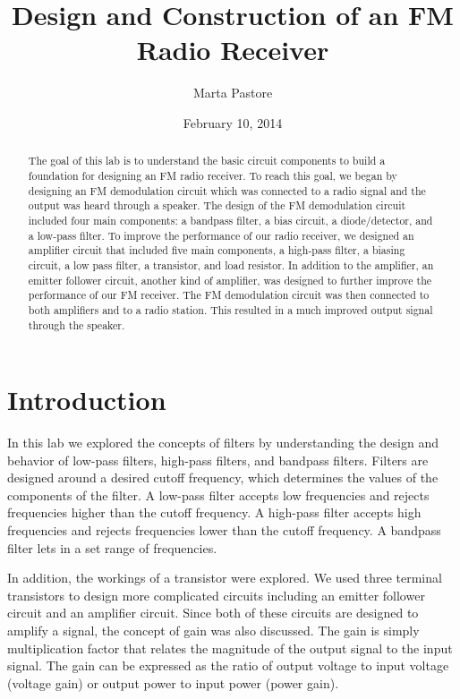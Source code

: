 \documentclass[12pt]{article}
\begin{document}
\title {Design and Construction of an FM Radio Receiver}
\author {Marta Pastore}
\date {February 10, 2014}
\maketitle 

\begin {abstract}
The goal of this lab is to understand the basic circuit components to
build a foundation for designing an FM radio receiver. To reach this
goal, we began by designing an FM demodulation circuit which was
connected to a radio signal and the output was heard through a
speaker. The design of the FM demodulation circuit included four main
components: a bandpass filter, a bias circuit, a diode/detector, and a
low-pass filter. To improve the performance of our radio receiver, we
designed an amplifier circuit that included five main components, a
high-pass filter, a biasing circuit, a low pass filter, a transistor,
and load resistor. In addition to the amplifier, an emitter follower
circuit, another kind of amplifier, was designed to further improve the
performance of our FM receiver. The FM demodulation circuit was then
connected to both amplifiers and to a radio station. This resulted in a
much improved output signal through the speaker.
\end {abstract}

\section {Introduction}
In this lab we explored the concepts of filters by understanding the
design and behavior of low-pass filters, high-pass filters, and bandpass
filters. Filters are designed around a desired cutoff frequency, which
determines the values of the components of the filter. A low-pass filter
accepts low frequencies and rejects frequencies higher than the cutoff
frequency. A high-pass filter accepts high frequencies and rejects
frequencies lower than the cutoff frequency. A bandpass filter lets in a
set range of frequencies.
 
In addition, the workings of a transistor were explored. We used three
terminal transistors to design more complicated circuits including an
emitter follower circuit and an amplifier circuit. Since both of these
circuits are designed to amplify a signal, the concept of gain was also
discussed. The gain is simply multiplication factor that relates the
magnitude of the output signal to the input signal. The gain can be
expressed as the ratio of output voltage to input voltage (voltage gain)
or output power to input power (power gain).
\end{document}
